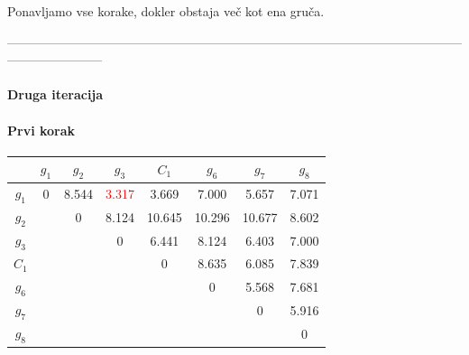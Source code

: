 \documentclass{article}
\begin{document}
\begin{enumerate}

		Ponavljamo vse korake, dokler obstaja več kot ena gruča.

		-----------------------------------------------------------------------------------------------------------------------------------

		\begin{center}
			\paragraph{Druga iteracija}
		\end{center}

		\paragraph{Prvi korak}

		\begin{center}
			\begin{tabular}{c||c|c|c|c|c|c|c|}
				& $g_1$ & $g_2$ & $g_3$ & $C_1$ & $g_6$ & $g_7$ & $g_8$ \\
				\hline
				\hline
				$g_1$ & 0     & 8.544 & \textcolor{red}{3.317} & 3.669 & 7.000 & 5.657 & 7.071 \\
				\hline
				$g_2$ &       & 0     & 8.124 & 10.645& 10.296 & 10.677 & 8.602 \\
				\hline
				$g_3$ &       &       & 0     & 6.441 & 8.124  & 6.403 & 7.000 \\
				\hline
				$C_1$ &       &       &       & 0     & 8.635  & 6.085 & 7.839 \\
				\hline
				$g_6$ &       &       &       &       & 0      & 5.568 & 7.681 \\
				\hline
				$g_7$ &       &       &       &       &        & 0     & 5.916 \\
				\hline
				$g_8$ &       &       &       &       &        &        & 0     \\
			\end{tabular}
		\end{center}


\end{enumerate}
\end{document}
